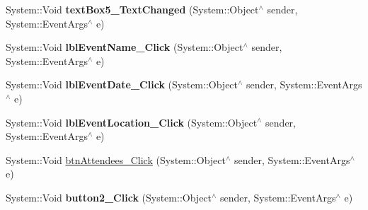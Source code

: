 \begin{DoxyCompactItemize}
\item 
\mbox{\label{class_project1_1_1_my_form_a31a32daf1fabbd522e394fb4b28d8f76}} 
System\+::\+Void {\bfseries text\+Box5\+\_\+\+Text\+Changed} (System\+::\+Object$^\wedge$ sender, System\+::\+Event\+Args$^\wedge$ e)
\item 
\mbox{\label{class_project1_1_1_my_form_aed020a5b7db333095f647a24a6678d23}} 
System\+::\+Void {\bfseries lbl\+Event\+Name\+\_\+\+Click} (System\+::\+Object$^\wedge$ sender, System\+::\+Event\+Args$^\wedge$ e)
\item 
\mbox{\label{class_project1_1_1_my_form_a73809b39a1e9a202d9ddbf375d5f978f}} 
System\+::\+Void {\bfseries lbl\+Event\+Date\+\_\+\+Click} (System\+::\+Object$^\wedge$ sender, System\+::\+Event\+Args$^\wedge$ e)
\item 
\mbox{\label{class_project1_1_1_my_form_a8b0ba98c4255661651aa169236cb6471}} 
System\+::\+Void {\bfseries lbl\+Event\+Location\+\_\+\+Click} (System\+::\+Object$^\wedge$ sender, System\+::\+Event\+Args$^\wedge$ e)
\item 
System\+::\+Void \mbox{\hyperlink{class_project1_1_1_my_form_ac5ad7cd78f1d764ff9ed4405127e6f34}{btn\+Attendees\+\_\+\+Click}} (System\+::\+Object$^\wedge$ sender, System\+::\+Event\+Args$^\wedge$ e)
\item 
\mbox{\label{class_project1_1_1_my_form_a0041b618e627f7fcafcd3a08bb277def}} 
System\+::\+Void {\bfseries button2\+\_\+\+Click} (System\+::\+Object$^\wedge$ sender, System\+::\+Event\+Args$^\wedge$ e)
\end{DoxyCompactItemize}
